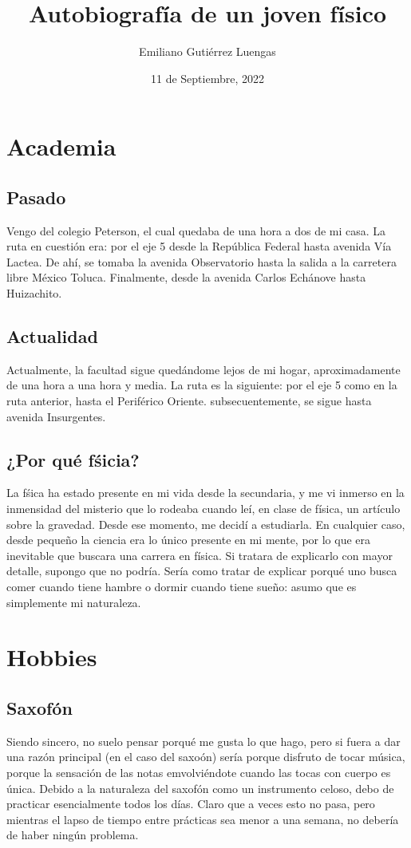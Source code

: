 \documentclass[letterpaper, 12pt]{article}
\title{Autobiografía de un joven f\'isico}
\author{Emiliano Gutiérrez Luengas}
\date{11 de Septiembre, 2022}
\begin{document}
\maketitle

\newpage
\section{\Large{Academia}}
  \subsection{\large{Pasado}}
   Vengo del colegio Peterson, el cual quedaba de una hora a dos de mi casa. La ruta en cuesti\'on era: por el eje 5 desde la Rep\'ublica Federal hasta avenida V\'ia Lactea. De ah\'i, se tomaba la avenida Observatorio hasta la salida a la carretera libre M\'exico Toluca. Finalmente, desde la avenida Carlos Ech\'anove hasta Huizachito.


  \subsection{\large{Actualidad}}
   Actualmente, la facultad sigue qued\'andome lejos de mi hogar, aproximadamente de una hora a una hora y media. La ruta es la siguiente: por el eje 5 como en la ruta anterior, hasta el Perif\'erico Oriente. subsecuentemente, se sigue hasta avenida Insurgentes.


  \subsection{\large{¿Por qu\'e f\'sicia?}}
  La f\'sica ha estado presente en mi vida desde la secundaria, y me vi inmerso en la inmensidad del misterio que lo rodeaba cuando le\'i, en clase de f\'isica, un art\'iculo sobre la gravedad. Desde ese momento, me decid\'i a estudiarla. En cualquier caso, desde peque\~no la ciencia era lo \'unico presente en mi mente, por lo que era inevitable que buscara una carrera en f\'isica. Si tratara de explicarlo con mayor detalle, supongo que no podr\'ia. Ser\'ia como tratar de explicar porqu\'e uno busca comer cuando tiene hambre o dormir cuando tiene sue\~no: asumo que es simplemente mi naturaleza.

\newpage
\section{\Large{Hobbies}}
  \subsection{\large{Saxof\'on}}
  Siendo sincero, no suelo pensar porqu\'e me gusta lo que hago, pero si fuera a dar una raz\'on principal (en el caso del saxo\'on) ser\'ia porque disfruto de tocar m\'usica, porque la sensaci\'on de las notas emvolvi\'endote cuando las tocas con cuerpo es \'unica. Debido a la naturaleza del saxof\'on como un instrumento celoso, debo de practicar esencialmente todos los d\'ias. Claro que a veces esto no pasa, pero mientras el lapso de tiempo entre pr\'acticas sea menor a una semana, no deber\'ia de haber ning\'un problema.
\end{document}
